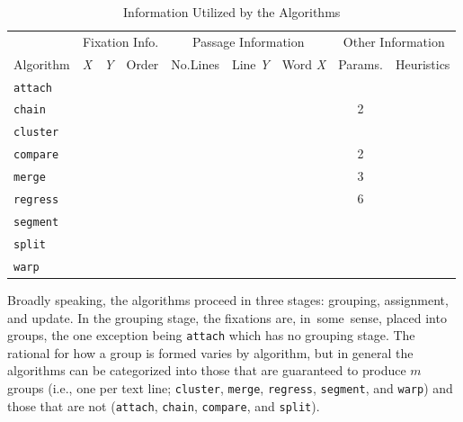 \documentclass[doc,biblatex]{apa7}
\begin{document}
	\begin{table}
	\begin{center}
	\begin{threeparttable}
	\caption{Information Utilized by the Algorithms}
	\begin{tabular}{lcccccccc}
	\hline
	& \multicolumn{3}{c}{Fixation Info.} & \multicolumn{3}{c}{Passage Information} & \multicolumn{2}{c}{Other Information} \\
	Algorithm & \textit{X} & \textit{Y} & Order & No.\@ Lines & Line \textit{Y} & Word \textit{X} & Params. & Heuristics \\ \hline
	\texttt{attach}  & & \checkmark & & & \checkmark & & & \\
	\texttt{chain}   & \checkmark & \checkmark & \checkmark & & \checkmark & & 2 & \\
	\texttt{cluster} & & \checkmark & & \checkmark & & & & \\
	\texttt{compare} & \checkmark & \checkmark & \checkmark & & \checkmark & \checkmark & 2 & \\
	\texttt{merge}   & \checkmark & \checkmark & \checkmark & \checkmark & & & 3 & \checkmark \\
	\texttt{regress} & \checkmark & \checkmark & & \checkmark & \checkmark & & 6 & \\
	\texttt{segment} & \checkmark & & \checkmark & \checkmark & & & & \\
	\texttt{split}   & \checkmark & \checkmark & \checkmark & & \checkmark & & & \\
	\texttt{warp}    & \checkmark & \checkmark & \checkmark & & \checkmark & \checkmark & & \\ \hline
	\end{tabular}
	\label{table1}
	\end{threeparttable}
	\end{center}
	\end{table}

Broadly speaking, the algorithms proceed in three stages: grouping, assignment, and update. In the grouping stage, the fixations are, in~some~sense, placed into groups, the one exception being \texttt{attach} which has no grouping stage. The rational for how a group is formed varies by algorithm, but in general the algorithms can be categorized into those that are guaranteed to produce $m$ groups (i.e., one per text line; \texttt{cluster}, \texttt{merge}, \texttt{regress}, \texttt{segment}, and \texttt{warp}) and those that are not (\texttt{attach}, \texttt{chain}, \texttt{compare}, and \texttt{split}).
\end{document}
